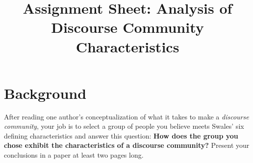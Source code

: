 \documentclass[10pt,oneside,twocolumn]{amsart}	%
\title[DC Analysis]{Assignment Sheet: Analysis of Discourse Community Characteristics}
\begin{document}
%
\thispagestyle{empty}
\setlength{\columnsep}{.25in}

	\section{Background} %
	\label{sec:background}
		After reading one author's conceptualization of what it takes to make a \emph{discourse community}, your job is to select a group of people you believe meets Swales' six defining characteristics and answer this question: \textbf{How does the group you chose exhibit the characteristics of a discourse community?} Present your conclusions in a paper at least two pages long.

	\begin{comment}
		\section{Objectives} %
		\label{sec:details}
		\todo[inline]{This section needs to be retooled to be aligned to student needs.}
			\begin{itemize}
				\item Understand how language practices mediate group activities
				\item Examine the discourses and texts of different communities
				\item Understand how language plays a role in discourse community enculturation
				\item Identify the relationship between language, identity, and authority
				\item Acquire tools for successfully responding to varied discourse conventions and genres in different classes
			\end{itemize}
	\end{comment}
\end{document}
